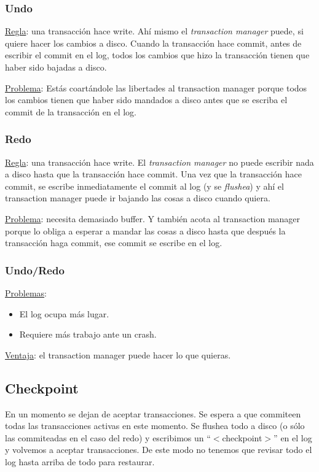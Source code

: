 \documentclass[]{article}
\begin{document}
\subsubsection{Undo}
\underline{Regla}: una transacción hace write. Ahí mismo el \emph{transaction manager} puede, si quiere hacer los cambios a disco. Cuando la transacción hace commit, antes de escribir el commit en el log, todos los cambios que hizo la transacción tienen que haber sido bajadas a disco.

\underline{Problema}: Estás coartándole las libertades al transaction manager porque todos los cambios tienen que haber sido mandados a disco antes que se escriba el commit de la transacción en el log.

\subsubsection{Redo}
\underline{Regla}: una transacción hace write. El \emph{transaction manager} no puede escribir nada a disco hasta que la transacción hace commit. Una vez que la transacción hace commit, se escribe inmediatamente el commit al log (y se \emph{flushea}) y ahí el transaction manager puede ir bajando las cosas a disco cuando quiera.

\underline{Problema}: necesita demasiado buffer. Y también acota al transaction manager porque lo obliga a esperar a mandar las cosas a disco hasta que después la transacción haga commit, ese commit se escribe en el log.

\subsubsection{Undo/Redo}
\underline{Problemas}:
\begin{itemize}
    \item El log ocupa más lugar.
    \item Requiere más trabajo ante un crash.
\end{itemize}

\underline{Ventaja}: el transaction manager puede hacer lo que quieras.

\subsection{Checkpoint}
En un momento se dejan de aceptar transacciones. Se espera a que commiteen todas las transacciones activas en este momento. Se flushea todo a disco (o sólo las commiteadas en el caso del redo) y escribimos un ``$<$checkpoint$>$'' en el log y volvemos a aceptar transacciones. De este modo no tenemos que revisar todo el log hasta arriba de todo para restaurar.
\end{document}
